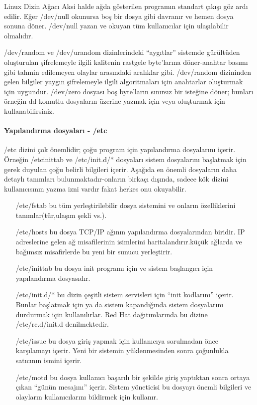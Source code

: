 \begin{section}{Linux Dizin Ağacı}
Aksi halde ağda gösterilen programın standart çıkışı göz ardı edilir. Eğer /dev/null okunursa boş bir dosya gibi davranır ve hemen dosya sonuna döner. /dev/null yazan ve okuyan tüm kullanıcılar için ulaşılabilir olmalıdır.

/dev/random ve /dev/urandom dizinlerindeki “aygıtlar” sistemde gürültüden oluşturulan şifrelemeyle ilgili kalitenin rastgele byte’larına döner-anahtar basımı gibi tahmin edilemeyen olaylar arasındaki aralıklar gibi. /dev/random dizininden gelen bilgiler yaygın şifrelemeyle ilgili algoritmaları için anahtarlar oluşturmak için uygundur. /dev/zero dosyası boş byte’ların sınırsız bir isteğine döner; bunları örneğin dd komutlu dosyaların üzerine yazmak için veya oluşturmak için kullanabilirsiniz.

\paragraph{Yapılandırma dosyaları - /etc}{/etc dizini çok önemlidir; çoğu program için yapılandırma dosyalarını içerir. Örneğin /etcinittab ve /etc/init.d/* dosyaları sistem dosyalarını başlatmak için gerek duyulan çoğu belirli bilgileri içerir. Aşağıda en önemli dosyaların daha detaylı tanımları bulunmaktadır-onların birkaçı dışında, sadece kök dizini kullanıcısının yazma izni vardır fakat herkes onu okuyabilir.}
\begin{itemize}
\item[/etc/fstab]bu tüm yerleştirilebilir dosya sistemini ve onların özelliklerini tanımlar(tür,ulaşım şekli vs.).
\item[/etc/hosts]bu dosya TCP/IP ağının yapılandırma dosyalarından biridir. IP adreslerine gelen ağ misafilerinin isimlerini haritalandırır.küçük ağlarda ve bağımsız misafirlerde bu yeni bir sunucu yerleştirir.
\item[/etc/inittab]bu dosya init programı için ve sistem başlangıcı için yapılandırma dosyasıdır.
\item[/etc/init.d/*]bu dizin çeşitli sistem servisleri için “init kodlarını” içerir. Bunlar başlatmak için ya da sistem kapandığında sistem dosyalarını durdurmak için kullanılırlar. Red Hat dağıtımlarında bu dizine /etc/rc.d/init.d denilmektedir.
\item[/etc/issue]bu dosya giriş yapmak için kullanıcıya sorulmadan önce karşılamayı içerir. Yeni bir sistemin yüklenmesinden sonra çoğunlukla satıcının ismini içerir.
\item[/etc/motd]bu dosya kullanıcı başarılı bir şekilde giriş yaptıktan sonra ortaya çıkan “günün mesajını” içerir. Sistem yöneticisi bu dosyayı önemli bilgileri ve olayların kullanıcılarını bildirmek için kullanır.

\end{itemize}
\end{section}
